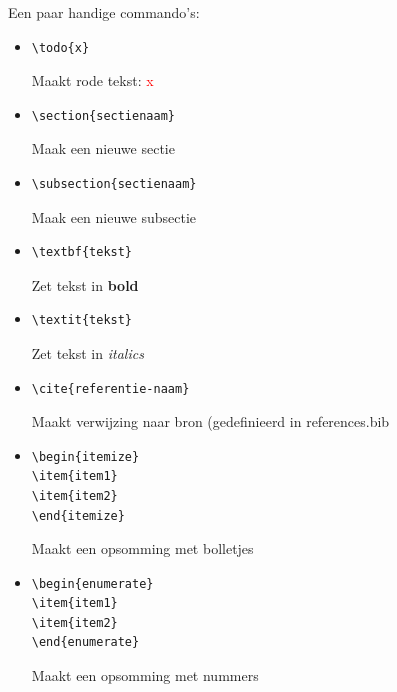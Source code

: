 \documentclass[10pt,a4paper]{article}
\newcommand{\todo}[1]{\textcolor{red}{#1}}
\begin{document}
\begin{multicols}{2}

Een paar handige commando's:
\begin{itemize}
\item{\begin{verbatim}\todo{x}\end{verbatim} Maakt rode tekst: \todo{x}}
\item{\begin{verbatim}\section{sectienaam}\end{verbatim}Maak een nieuwe sectie}
\item{\begin{verbatim}\subsection{sectienaam}\end{verbatim}Maak een nieuwe subsectie}
\item{\begin{verbatim}\textbf{tekst}\end{verbatim}Zet tekst in \textbf{bold}}
\item{\begin{verbatim}\textit{tekst}\end{verbatim}Zet tekst in \textit{italics}}
\item{\begin{verbatim}\cite{referentie-naam}\end{verbatim}Maakt verwijzing naar bron (gedefinieerd in references.bib}
\item{\begin{verbatim}\begin{itemize}
\item{item1}
\item{item2}
\end{itemize}\end{verbatim}Maakt een opsomming met bolletjes}
\item{\begin{verbatim}\begin{enumerate}
\item{item1}
\item{item2}
\end{enumerate}\end{verbatim}Maakt een opsomming met nummers}

\end{itemize}


\end{multicols}
\end{document}
